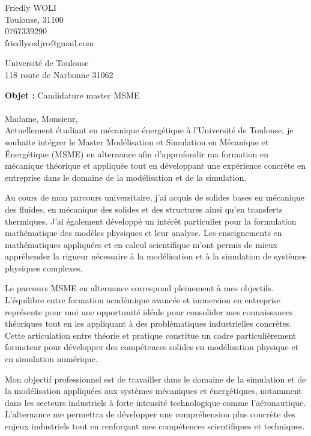 \documentclass[11pt,a4paper]{article}
\begin{document}
	\pagestyle{empty}
	
	\noindent
	Friedly WOLI \\  %
	Toulouse, 31100  \\
	0767339290 \\
	friedlysedjro@gmail.com 
	
	\begin{flushright}
		
		Université de Toulouse \\
		118 route de Narbonne 31062 
	\end{flushright}
	
	
	\bigskip
	
	
	
	
	
	
	\textbf{Objet :} Candidature master MSME \\  \\
Madame, Monsieur, \\ 

Actuellement étudiant en mécanique énergétique à l’Université de Toulouse, je souhaite intégrer le Master Modélisation et Simulation en Mécanique et Énergétique (MSME) en alternance afin d’approfondir ma formation en mécanique théorique et appliquée tout en développant une expérience concrète en entreprise dans le domaine de la modélisation et de la simulation.

Au cours de mon parcours universitaire, j’ai acquis de solides bases en mécanique des fluides, en mécanique des solides et des structures ainsi qu’en transferts thermiques. J’ai également développé un intérêt particulier pour la formulation mathématique des modèles physiques et leur analyse. Les enseignements en mathématiques appliquées et en calcul scientifique m’ont permis de mieux appréhender la rigueur nécessaire à la modélisation et à la simulation de systèmes physiques complexes.

Le parcours MSME en alternance correspond pleinement à mes objectifs. L’équilibre entre formation académique avancée et immersion en entreprise représente pour moi une opportunité idéale pour consolider mes connaissances théoriques tout en les appliquant à des problématiques industrielles concrètes. Cette articulation entre théorie et pratique constitue un cadre particulièrement formateur pour développer des compétences solides en modélisation physique et en simulation numérique.

Mon objectif professionnel est de travailler dans le domaine de la simulation et de la modélisation appliquées aux systèmes mécaniques et énergétiques, notamment dans les secteurs industriels à forte intensité technologique comme l’aéronautique. L’alternance me permettra de développer une compréhension plus concrète des enjeux industriels tout en renforçant mes compétences scientifiques et techniques.
\end{document}
